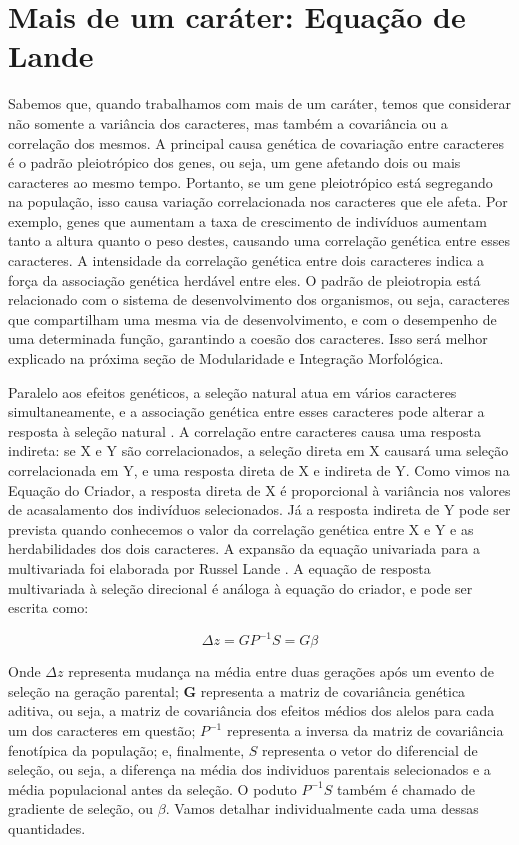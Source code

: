 \documentclass[portuges,]{tufte-handout}
\begin{document}
\section{Mais de um caráter: Equação de
Lande}\label{mais-de-um-caruxe1ter-equauxe7uxe3o-de-lande}

Sabemos que, quando trabalhamos com mais de um caráter, temos que
considerar não somente a variância dos caracteres, mas também a
covariância ou a correlação dos mesmos. A principal causa genética de
covariação entre caracteres é o padrão pleiotrópico dos genes, ou seja,
um gene afetando dois ou mais caracteres ao mesmo tempo. Portanto, se um
gene pleiotrópico está segregando na população, isso causa variação
correlacionada nos caracteres que ele afeta. Por exemplo, genes que
aumentam a taxa de crescimento de indivíduos aumentam tanto a altura
quanto o peso destes, causando uma correlação genética entre esses
caracteres. A intensidade da correlação genética entre dois caracteres
indica a força da associação genética herdável entre eles. O padrão de
pleiotropia está relacionado com o sistema de desenvolvimento dos
organismos, ou seja, caracteres que compartilham uma mesma via de
desenvolvimento, e com o desempenho de uma determinada função,
garantindo a coesão dos caracteres. Isso será melhor explicado na
próxima seção de Modularidade e Integração Morfológica.

Paralelo aos efeitos genéticos, a seleção natural atua em vários
caracteres simultaneamente, e a associação genética entre esses
caracteres pode alterar a resposta à seleção natural
\cite{Lande1983a}. A correlação entre caracteres causa uma resposta
indireta: se X e Y são correlacionados, a seleção direta em X causará
uma seleção correlacionada em Y, e uma resposta direta de X e indireta
de Y. Como vimos na Equação do Criador, a resposta direta de X é
proporcional à variância nos valores de acasalamento dos indivíduos
selecionados. Já a resposta indireta de Y pode ser prevista quando
conhecemos o valor da correlação genética entre X e Y e as
herdabilidades dos dois caracteres. A expansão da equação univariada
para a multivariada foi elaborada por Russel Lande \cite{Lande1979}.
A equação de resposta multivariada à seleção direcional é análoga à
equação do criador, e pode ser escrita como:

\[
\Delta z = GP^{-1}S = G\beta
\]

Onde \(\Delta z\) representa mudança na média entre duas gerações após
um evento de seleção na geração parental; \(\mathbf{G}\) representa a
matriz de covariância genética aditiva, ou seja, a matriz de covariância
dos efeitos médios dos alelos para cada um dos caracteres em questão;
\(P^{-1}\) representa a inversa da matriz de covariância fenotípica da
população; e, finalmente, \(S\) representa o vetor do diferencial de
seleção, ou seja, a diferença na média dos individuos parentais
selecionados e a média populacional antes da seleção. O poduto
\(P^{-1}S\) também é chamado de gradiente de seleção, ou \(\beta\).
Vamos detalhar individualmente cada uma dessas quantidades.
\end{document}
